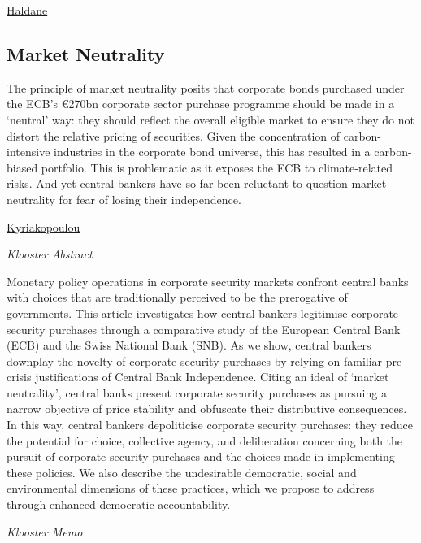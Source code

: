 \documentclass[
]{book}
\begin{document}
\href{https://bankplassen.norges-bank.no/2021/04/16/central-bank-independence-a-practitioners-perspective/\#more-1994}{Haldane}

\hypertarget{market-neutrality}{%
\subsection{Market Neutrality}\label{market-neutrality}}

The principle of market neutrality posits that corporate bonds purchased under the ECB's €270bn corporate sector purchase programme should be made in a `neutral' way: they should reflect the overall eligible market to ensure they do not distort the relative pricing of securities. Given the concentration of carbon-intensive industries in the corporate bond universe, this has resulted in a carbon-biased portfolio. This is problematic as it exposes the ECB to climate-related risks. And yet central bankers have so far been reluctant to question market neutrality for fear of losing their independence.

\href{https://www.omfif.org/2021/02/ecb-market-neutrality-crumbling/}{Kyriakopoulou}

\emph{Klooster Abstract}

Monetary policy operations in corporate security markets confront central
banks with choices that are traditionally perceived to be the prerogative of
governments. This article investigates how central bankers legitimise
corporate security purchases through a comparative study of the
European Central Bank (ECB) and the Swiss National Bank (SNB). As we
show, central bankers downplay the novelty of corporate security
purchases by relying on familiar pre-crisis justifications of Central Bank
Independence. Citing an ideal of `market neutrality', central banks
present corporate security purchases as pursuing a narrow objective of
price stability and obfuscate their distributive consequences. In this way,
central bankers depoliticise corporate security purchases: they reduce
the potential for choice, collective agency, and deliberation concerning
both the pursuit of corporate security purchases and the choices made
in implementing these policies. We also describe the undesirable
democratic, social and environmental dimensions of these practices,
which we propose to address through enhanced democratic
accountability.

\emph{Klooster Memo}
\end{document}
